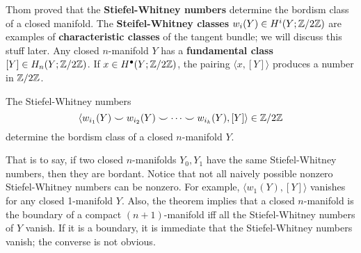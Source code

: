 Thom proved that the \textbf{Stiefel-Whitney numbers} determine the bordism class of a closed manifold. The \textbf{Steifel-Whitney classes} $w_i (Y) \in H^i  (Y; \mathbb{Z} /2\mathbb{Z})$ are examples of \textbf{characteristic classes} of the tangent bundle; we will discuss this stuff later. Any closed $n$-manifold $Y$ has a \textbf{fundamental class} $[Y] \in H_n (Y;\mathbb{Z} /2\mathbb{Z})$. If $x \in H^{\bullet}(Y; \mathbb{Z} /2\mathbb{Z})$, the pairing $\langle x,[Y] \rangle $ produces a number in $\mathbb{Z} /2\mathbb{Z}$.
\begin{theorem}
    The Stiefel-Whitney numbers \[
        \langle w_{i_1} (Y)\smile w_{i_2}(Y)\smile \cdots \smile w_{i_k}(Y),[Y]\rangle \in \mathbb{Z} /2 \mathbb{Z}
    \] determine the bordism class of a closed $n$-manifold $Y$.
\end{theorem}
That is to say, if two closed $n$-manifolds $Y_0,Y_1$ have the same Stiefel-Whitney numbers, then they are bordant. Notice that not all naively possible nonzero Stiefel-Whitney numbers can be nonzero. For example, $\langle w_1(Y),[Y] \rangle $ vanishes for any closed 1-manifold $Y$. Also, the theorem implies that a closed $n$-manifold is the boundary of a compact $(n+1)$-manifold iff all the Stiefel-Whitney numbers of $Y$ vanish. If it is a boundary, it is immediate that the Stiefel-Whitney numbers vanish; the converse is not obvious. 
